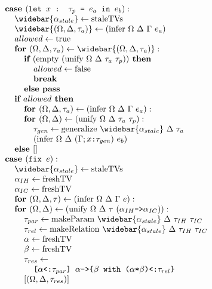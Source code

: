 \documentclass[acmsmall]{acmart}
\begin{document}
\begin{figure*}[h]
\[\begin{array}[t]{@{} l}
    \I \B{case } (\code{let $x$ : $\tau_p$ = $e_a$ in $e_b$}) :  
    \\
    \I\I \widebar{\alpha_{stale}} \leftarrow \F{staleTVs}
    \\
    \I\I \widebar{(\Omega, \Delta, \tau_a)} \leftarrow (\F{infer } \Omega\ \Delta\ \Gamma\ e_a)
    \\
    \I\I allowed \leftarrow \F{true}
    \\
    \I\I \B{for } (\Omega, \Delta, \tau_a) \leftarrow \widebar{(\Omega, \Delta, \tau_a)}:
    \\
    \I\I\I \B{if } (\F{empty } (\F{unify } \Omega\ \Delta\ \tau_a\ \tau_p)) \B{ then }
    \\
    \I\I\I\I allowed \leftarrow \F{false}
    \\
    \I\I\I\I \B{break}
    \\
    \I\I\I \B{else } \B{pass}
    \\
    \I\I \B{if } allowed \B{ then }
    \\
    \I\I\I \B{for } (\Omega, \Delta, \tau_a) \leftarrow (\F{infer } \Omega\ \Delta\ \Gamma\ e_a):
    \\
    \I\I\I \B{for } (\Omega, \Delta) \leftarrow (\F{unify } \Omega\ \Delta\ \tau_a\ \tau_p):
    \\
    \I\I\I\I \tau_{gen} \leftarrow \F{generalize } \widebar{\alpha_{stale}}\ \Delta\ \tau_a
    \\
    \I\I\I\I (\F{infer } \Omega\ \Delta\ (\Gamma;\code{$x$:$\tau_{gen}$})\ e_b)
    \\
    \I\I \B{else } [] 

    \\

    \I \B{case } (\code{fix $e$}) :  
    \\
    \I\I \widebar{\alpha_{stale}} \leftarrow \F{staleTVs}
    \\
    \I\I \alpha_{IH} \leftarrow \F{freshTV}
    \\
    \I\I \alpha_{IC} \leftarrow \F{freshTV}
    \\
    \I\I \B{for } (\Omega, \Delta, \tau) \leftarrow (\F{infer}\ \Omega\ \Delta\ \Gamma\ e):
    \\
    \I\I \B{for } (\Omega, \Delta) \leftarrow (\F{unify}\ \Omega\ \Delta\ \tau\ (\code{$\alpha_{IH}$->$\alpha_{IC}$})): 
    \\
    \I\I\I \tau_{par} \leftarrow \F{makeParam}\ \widebar{\alpha_{stale}}\ \Delta\ \tau_{IH}\ \tau_{IC}
    \\
    \I\I\I \tau_{rel} \leftarrow \F{makeRelation}\ \widebar{\alpha_{stale}}\ \Delta\ \tau_{IH}\ \tau_{IC}
    \\
    \I\I\I \alpha \leftarrow \F{freshTV}
    \\
    \I\I\I \beta \leftarrow \F{freshTV}
    \\
    \I\I\I \tau_{res} \leftarrow
    \\
    \I\I\I\I \code{[$\alpha$<:$\tau_{par}$] $\alpha$->\{$\beta$ with ($\alpha$*$\beta$)<:$\tau_{rel}$\}}
    \\
    \I\I\I [(\Omega, \Delta, \tau_{res})]


\end{array}\]
\end{figure*}
\end{document}
